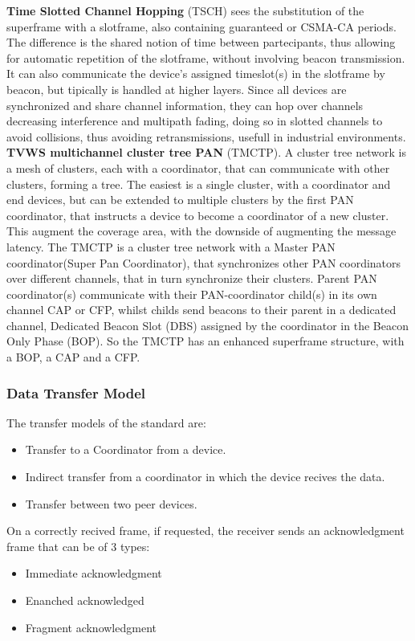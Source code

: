 \documentclass[conference]{IEEEtran}
\begin{document}
\textbf{Time Slotted Channel Hopping} (TSCH) sees the substitution of the superframe with a 
slotframe, also containing guaranteed or CSMA-CA periods. The difference is the shared notion 
of time between partecipants, thus allowing for automatic repetition of the slotframe, without 
involving beacon transmission. It can also communicate the device's assigned timeslot(s) in
the slotframe by beacon, but tipically is handled at higher layers.
Since all devices are synchronized and share channel information, they can hop over channels
decreasing interference and multipath fading, doing so in slotted channels to avoid collisions,
thus avoiding retransmissions, usefull in industrial environments.\\

\textbf{TVWS multichannel cluster tree PAN} (TMCTP).
A cluster tree network is a mesh of clusters, each with a coordinator,
that can communicate with other clusters, forming a tree. The easiest is a single cluster,
with a coordinator and end devices, but can be extended to multiple clusters
by the first PAN coordinator, that instructs a device to become a coordinator 
of a new cluster. This augment the coverage area, with the downside of augmenting the
message latency.
The TMCTP is a cluster tree network with a Master PAN coordinator(Super Pan Coordinator), that
synchronizes other PAN coordinators over different channels, that in turn synchronize
their clusters.
Parent PAN coordinator(s) communicate with their PAN-coordinator child(s) in its own channel 
CAP or CFP, whilst childs send beacons to their parent in a dedicated channel,
Dedicated Beacon Slot (DBS) assigned by the coordinator in the Beacon Only Phase (BOP).
So the TMCTP has an enhanced superframe structure, with a BOP, a CAP and a CFP.\\

\subsubsection{Data Transfer Model}
The transfer models of the standard\cite{10794632} are:
\begin{itemize}
    \item Transfer to a Coordinator from a device.
    \item Indirect transfer from a coordinator in which the device recives the data.
    \item Transfer between two peer devices.
\end{itemize}

On a correctly recived frame, if requested, the receiver sends an acknowledgment frame that 
can be of 3 types:
\begin{itemize}
    \item Immediate acknowledgment
    \item Enanched acknowledged
    \item Fragment acknowledgment
\end{itemize}
\end{document}
